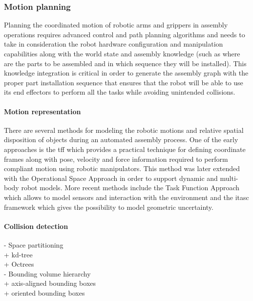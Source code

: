 \subsubsection{Motion planning}

Planning the coordinated motion of robotic arms \cite{Rickert2011} and grippers in assembly operations requires advanced control \cite{Stolt2015} and path planning algorithms \cite{Kuffner2000,You2012,Fontanals2014,mopl2015} and needs to take in consideration the robot hardware configuration and manipulation capabilities along with the world state and assembly knowledge \cite{Tenorth14} (such as where are the parts to be assembled and in which sequence they will be installed). This knowledge integration is critical in order to generate the assembly graph with the proper part installation sequence that ensures that the robot will be able to use its end effectors to perform all the tasks \cite{Thomas2003,Thomas2011} while avoiding unintended collisions.


\paragraph{Motion representation}

There are several methods for modeling the robotic motions and relative spatial disposition of objects during an automated assembly process. One of the early approaches is the \gls{tff} \cite{Mason1981,Finkemeyer2004} which provides a practical technique for defining coordinate frames along with pose, velocity and force information required to perform compliant motion using robotic manipulators. This method was later extended with the Operational Space Approach \cite{Khatib1987,DeSapio2006} in order to support dynamic and multi-body robot models. More recent methods include the Task Function Approach \cite{Samson1991} which allows to model sensors and interaction with the environment and the \gls{itasc} framework \cite{DeSchutter-ijrr2007,Smits2010} which gives the possibility to model geometric uncertainty.


\paragraph{Collision detection}

- Space partitioning\\
	+ kd-tree\\
	+ Octrees\\
- Bounding volume hierarchy\\
	+ axis-aligned bounding boxes\\
	+ oriented bounding boxes\\


